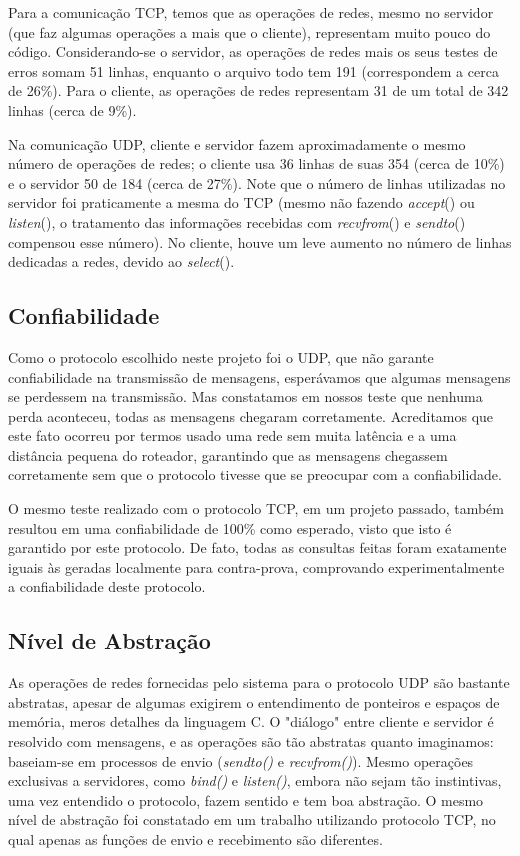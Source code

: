 \documentclass[12pt,a4paper]{article}
\begin{document}
Para a comunicação TCP, temos que as operações de redes, mesmo no servidor (que faz algumas operações a mais que o cliente), representam muito pouco do código. Considerando-se o servidor, as operações de redes mais os seus testes de erros somam 51 linhas, enquanto o arquivo todo tem 191 (correspondem a cerca de 26\%). Para o cliente, as operações de redes representam 31 de um total de 342 linhas (cerca de 9\%).

Na comunicação UDP, cliente e servidor fazem aproximadamente o mesmo número de operações de redes; o cliente usa 36 linhas de suas 354 (cerca de 10\%) e o servidor 50 de 184 (cerca de 27\%). Note que o número de linhas utilizadas no servidor foi praticamente a mesma do TCP (mesmo não fazendo {\it accept}() ou {\it listen}(), o tratamento das informações recebidas com {\it recvfrom}() e {\it sendto}() compensou esse número). No cliente, houve um leve aumento no número de linhas dedicadas a redes, devido ao {\it select}().

\subsection{Confiabilidade}

Como o protocolo escolhido neste projeto foi o UDP, que não garante confiabilidade na transmissão de mensagens, esperávamos que algumas mensagens se perdessem na transmissão. Mas constatamos em nossos teste que nenhuma perda aconteceu, todas as mensagens chegaram corretamente. Acreditamos que este fato ocorreu por termos usado uma rede sem muita latência e a uma distância pequena do roteador, garantindo que as mensagens chegassem corretamente sem que o protocolo tivesse que se preocupar com a confiabilidade.

O mesmo teste realizado com o protocolo TCP, em um projeto passado, também resultou em uma confiabilidade de 100\% como esperado, visto que isto é garantido por este protocolo. De fato, todas as consultas feitas foram exatamente iguais às geradas localmente para contra-prova, comprovando experimentalmente a confiabilidade deste protocolo.

\subsection{Nível de Abstração}

As operações de redes fornecidas pelo sistema para o protocolo UDP são bastante abstratas, apesar de algumas exigirem o entendimento de ponteiros e espaços de memória, meros detalhes da linguagem C. O "diálogo" entre cliente e servidor é resolvido com mensagens, e as operações são tão abstratas quanto imaginamos: baseiam-se em processos de envio ({\it sendto()} e {\it recvfrom()}). Mesmo operações exclusivas a servidores, como {\it bind()} e {\it listen()}, embora não sejam tão instintivas, uma vez entendido o protocolo, fazem sentido e tem boa abstração. O mesmo nível de abstração foi constatado em um trabalho utilizando protocolo TCP, no qual apenas as funções de envio e recebimento são diferentes.
\end{document}
